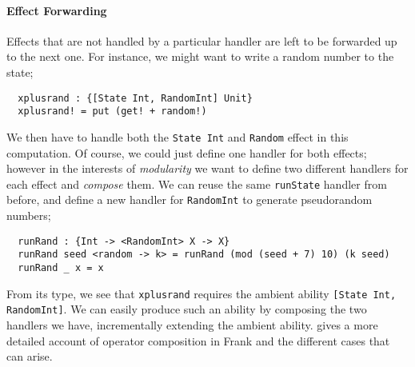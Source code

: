 \documentclass[msc,deptreport,cs]{infthesis} %
\newcommand{\code}[1]{\lstinline{#1}}
\newcommand{\todo}[1]
           {{\par\noindent\small\color{RoyalPurple}
  \framebox{\parbox{\dimexpr\linewidth-2\fboxsep-2\fboxrule}
    {\textbf{TODO:} #1}}}}
\begin{document}
\paragraph*{Effect Forwarding}

Effects that are not handled by a particular handler are left to be forwarded up
to the next one. For instance, we might want to write a random number to the
state;

\begin{lstlisting}
  xplusrand : {[State Int, RandomInt] Unit}
  xplusrand! = put (get! + random!)
\end{lstlisting}

\noindent We then have to handle both the \code{State Int} and \code{Random}
effect in this computation. Of course, we could just define one handler for both
effects; however in the interests of \emph{modularity} we want to define two
different handlers for each effect and \emph{compose} them. We can reuse the
same \code{runState} handler from before, and define a new handler for
\code{RandomInt} to generate pseudorandom numbers;

\begin{lstlisting}
  runRand : {Int -> <RandomInt> X -> X}
  runRand seed <random -> k> = runRand (mod (seed + 7) 10) (k seed)
  runRand _ x = x
\end{lstlisting}

\noindent From its type, we see that \code{xplusrand} requires the ambient
ability \code{[State Int, RandomInt]}. We can easily produce such an ability by
composing the two handlers we have, incrementally extending the ambient ability.
\cite{convent2017enhancing} gives a more detailed account of operator
composition in Frank and the different cases that can arise.



\end{document}
